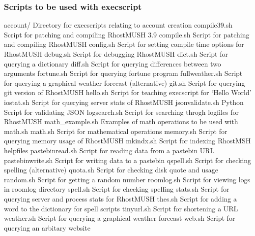 \documentclass[letterpaper,10pt,english]{sphinxmanual}
\begin{document}
\subsubsection{Scripts to be used with execscript}
\label{\detokenize{advanced:scripts-to-be-used-with-execscript}}
\sphinxAtStartPar
account/                       \textendash{} Directory for execscripts relating to account creation
compile39.sh                   \textendash{} Script for patching and compiling RhostMUSH 3.9
compile.sh                     \textendash{} Script for patching and compiling RhostMUSH
config.sh                      \textendash{} Script for setting compile time options for RhostMUSH
debug.sh                       \textendash{} Script for debugging RhostMUSH
dict.sh                        \textendash{} Script for querying a dictionary
diff.sh                        \textendash{} Script for querying differences between two arguments
fortune.sh                     \textendash{} Script for querying fortune program
fullweather.sh                 \textendash{} Script for querying a graphical weather forecast (alternative)
git.sh                         \textendash{} Script for querying git version of RhostMUSH
hello.sh                       \textendash{} Script for teaching execscript for ‘Hello World’
iostat.sh                      \textendash{} Script for querying server stats of RhostMUSH
jsonvalidate.sh                \textendash{} Python Script for validating JSON
logsearch.sh                   \textendash{} Script for searching throgh logfiles for RhostMUSH
math\_example.sh                \textendash{} Examples of math operations to be used with math.sh
math.sh                        \textendash{} Script for mathematical operations
memory.sh                      \textendash{} Script for querying memory usage of RhostMUSH
mkindx.sh                      \textendash{} Script for indexing RhostMSH helpfiles
pastebinread.sh                \textendash{} Script for reading data from a pastebin URL
pastebinwrite.sh               \textendash{} Script for writing data to a pastebin
qspell.sh                      \textendash{} Script for checking spelling (alternative)
quota.sh                       \textendash{} Script for checking disk quote and usage
random.sh                      \textendash{} Script for getting a random number
roomlog.sh                     \textendash{} Script for viewing logs in roomlog directory
spell.sh                       \textendash{} Script for checking spelling
stats.sh                       \textendash{} Script for querying server and process stats for RhostMUSH
thes.sh                        \textendash{} Script for adding a word to the dictionary for spell scripts
tinyurl.sh                     \textendash{} Script for shortening a URL
weather.sh                     \textendash{} Script for querying a graphical weather forecast
web.sh                         \textendash{} Script for querying an arbitary website
\end{document}
